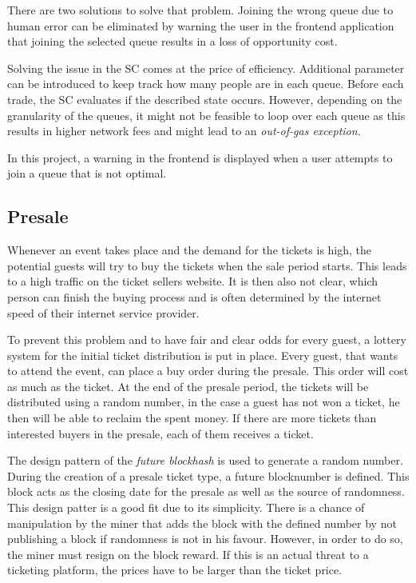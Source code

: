 There are two solutions to solve that problem. Joining the wrong queue due to human error can be eliminated by warning the user in the frontend application that joining the selected queue results in a loss of opportunity cost. 

Solving the issue in the SC comes at the price of efficiency. Additional parameter can be introduced to keep track how many people are in each queue. Before each trade, the SC evaluates if the described state occurs. However, depending on the granularity of the queues, it might not be feasible to loop over each queue as this results in higher network fees and might lead to an 
\textit{out-of-gas exception}.

In this project, a warning in the frontend is displayed when a user attempts to join a queue that is not optimal.

\subsection{Presale}\label{section:des:presale}
Whenever an event takes place and the demand for the tickets is high, the potential guests will try to buy the tickets when the sale period starts. This leads to a high traffic on the ticket sellers website. It is then also not clear, which person can finish the buying process and is often determined by the internet speed of their internet service provider.

To prevent this problem and to have fair and clear odds for every guest, a lottery system for the initial ticket distribution is put in place. Every guest, that wants to attend the event, can place a buy order during the presale. This order will cost as much as the ticket. At the end of the presale period, the tickets will be distributed using a random number, in the case a guest has not won a ticket, he then will be able to reclaim the spent money. If there are more tickets than interested buyers in the presale, each of them receives a ticket. 

The design pattern of the \textit{future blockhash} is used to generate a random number. During the creation of a presale ticket type, a future blocknumber is defined. This block acts as the closing date for the presale as well as the source of randomness. This design patter is a good fit due to its simplicity. There is a chance of manipulation by the miner that adds the block with the defined number by not publishing a block if randomness is not in his favour. However, in order to do so, the miner must resign on the block reward. If this is an actual threat to a ticketing platform, the prices have to be larger than the ticket price. 


